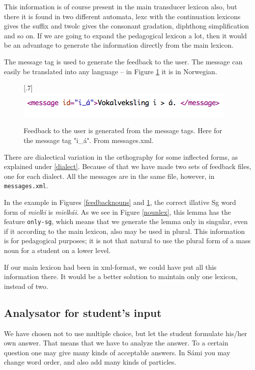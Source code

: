 \documentclass[a4paper,12pt]{article}
\begin{document}
This information is of course present in the main transducer lexicon also, but there it is found in two different automata, lexc with the continuation lexicons gives the suffix and twolc gives the consonant gradation, diphthong simplification and so on. If we are going to expand the pedagogical lexicon a lot, then it would be an advantage to generate the information directly from the main lexicon. 

The message tag is used to generate the feedback to the user. The message can easily be translated into any language -- in Figure \ref{mess} it is in Norwegian.

\begin{figure}[htbp]
\begin{center}
\scalebox{.7}[.7]{\includegraphics{img/messages.png}}\\
\caption{Feedback to the user is generated from the message tags. Here for the message tag "i\_á". From messages.xml.}
\label{mess}
\end{center}
\end{figure}

There are dialectical variation in the orthography for some inflected forms, as explained under \ref{dialect}. Because of that we have made two sets of feedback files, one for each dialect. All the messages are in the same file, however, in \texttt{messages.xml}.

In the example in Figures \ref{feedbacknouns} and \ref{mess}, the correct illative Sg word form of \textit{mielki} is \textit{mielkái}. As we see in Figure \ref{nounlex}, this lemma has the feature \texttt{only-sg}, which means that we generate the lemma only in singular, even if it according to the main lexicon, also may be used in plural. This information is for pedagogical purposes; it is not that natural to use the plural form of a mass noun for a student on a lower level.

If our main lexicon had been in xml-format, we could have put all this information there. It would be a better solution to maintain only one lexicon, instead of two.


\subsection{Analysator for student's input}\label{sentencefeedback}
We have chosen not to use multiple choice, but let the student formulate his/her own answer. That means that we have to analyze the answer. To a certain question one may give many kinds of acceptable answers. In Sámi you may change word order, and also add many kinds of particles.\\
\end{document}
